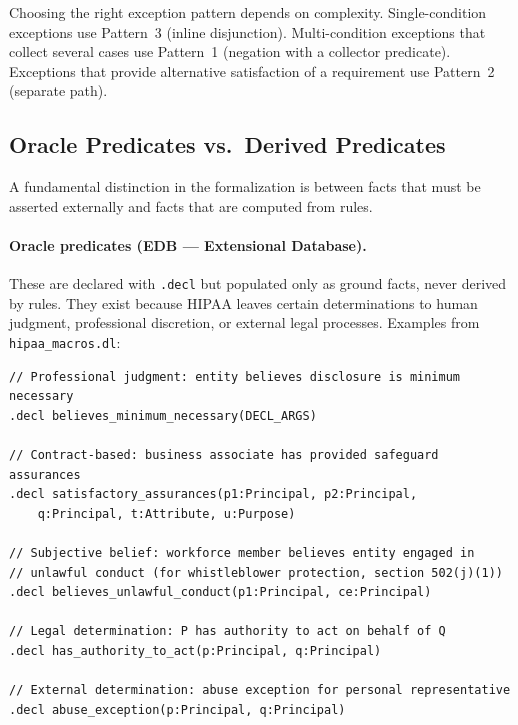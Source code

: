 \documentclass[11pt,letterpaper]{article}
\begin{document}
\begin{designbox}
Choosing the right exception pattern depends on complexity. Single-condition exceptions use Pattern~3 (inline disjunction). Multi-condition exceptions that collect several cases use Pattern~1 (negation with a collector predicate). Exceptions that provide alternative satisfaction of a requirement use Pattern~2 (separate path).
\end{designbox}

\subsection{Oracle Predicates vs.\ Derived Predicates}
\label{sec:oracle-vs-derived}

A fundamental distinction in the formalization is between facts that must be asserted externally and facts that are computed from rules.

\paragraph{Oracle predicates (EDB --- Extensional Database).} These are declared with \texttt{.decl} but populated only as ground facts, never derived by rules. They exist because HIPAA leaves certain determinations to human judgment, professional discretion, or external legal processes. Examples from \texttt{hipaa\_macros.dl}:

\begin{lstlisting}[style=soufflestyle,caption={Oracle predicates (from hipaa\_macros.dl and hipaa\_164\_502.dl)}]
// Professional judgment: entity believes disclosure is minimum necessary
.decl believes_minimum_necessary(DECL_ARGS)

// Contract-based: business associate has provided safeguard assurances
.decl satisfactory_assurances(p1:Principal, p2:Principal,
    q:Principal, t:Attribute, u:Purpose)

// Subjective belief: workforce member believes entity engaged in
// unlawful conduct (for whistleblower protection, section 502(j)(1))
.decl believes_unlawful_conduct(p1:Principal, ce:Principal)

// Legal determination: P has authority to act on behalf of Q
.decl has_authority_to_act(p:Principal, q:Principal)

// External determination: abuse exception for personal representative
.decl abuse_exception(p:Principal, q:Principal)
\end{lstlisting}
\end{document}

